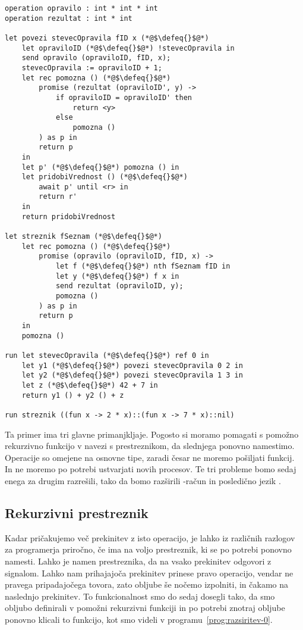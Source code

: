 \begin{lstlisting}[caption={Računanje zahtevne funkcije v ozadju.},label={prog:razsiritev-0},float,floatplacement=h]
operation opravilo : int * int * int
operation rezultat : int * int

let povezi stevecOpravila fID x (*@$\defeq{}$@*)
    let opraviloID (*@$\defeq{}$@*) !stevecOpravila in
    send opravilo (opraviloID, fID, x);
    stevecOpravila := opraviloID + 1;
    let rec pomozna () (*@$\defeq{}$@*)
    	promise (rezultat (opraviloID', y) ->
    		if opraviloID = opraviloID' then
    			return <y>
    		else
    			pomozna ()
    	) as p in
    	return p
    in
    let p' (*@$\defeq{}$@*) pomozna () in
    let pridobiVrednost () (*@$\defeq{}$@*)
    	await p' until <r> in
    	return r'
    in
    return pridobiVrednost

let streznik fSeznam (*@$\defeq{}$@*)
    let rec pomozna () (*@$\defeq{}$@*)
    	promise (opravilo (opraviloID, fID, x) ->
    		let f (*@$\defeq{}$@*) nth fSeznam fID in
    		let y (*@$\defeq{}$@*) f x in
    		send rezultat (opraviloID, y);
    		pomozna ()
    	) as p in
    	return p
    in
    pomozna ()

run	let stevecOpravila (*@$\defeq{}$@*) ref 0 in
    let y1 (*@$\defeq{}$@*) povezi stevecOpravila 0 2 in
    let y2 (*@$\defeq{}$@*) povezi stevecOpravila 1 3 in
    let z (*@$\defeq{}$@*) 42 + 7 in
    return y1 () + y2 () + z

run streznik ((fun x -> 2 * x)::(fun x -> 7 * x)::nil)
\end{lstlisting}


Ta primer ima tri glavne primanjkljaje. Pogosto si moramo pomagati s pomožno rekurzivno funkcijo v navezi s prestreznikom, da slednjega ponovno namestimo. Operacije so omejene na osnovne tipe, zaradi česar ne moremo pošiljati funkcij. In ne moremo po potrebi ustvarjati novih procesov.
Te tri probleme bomo sedaj enega za drugim razrešili, tako da bomo razširili \lae{}-račun in posledično jezik \aeff{}.


\subsection{Rekurzivni prestreznik}


Kadar pričakujemo več prekinitev z isto operacijo, je lahko iz različnih razlogov za programerja priročno, če ima na voljo prestreznik, ki se po potrebi ponovno namesti. Lahko je namen prestreznika, da na vsako prekinitev odgovori z signalom. Lahko nam prihajajoča prekinitev prinese pravo operacijo, vendar ne pravega pripadajočega tovora, zato obljube še nočemo izpolniti, in čakamo na naslednjo prekinitev.
To funkcionalnost smo do sedaj dosegli tako, da smo obljubo definirali v pomožni rekurzivni funkciji in po potrebi znotraj obljube ponovno klicali to funkcijo, kot smo videli v programu~\ref{prog:razsiritev-0}.

